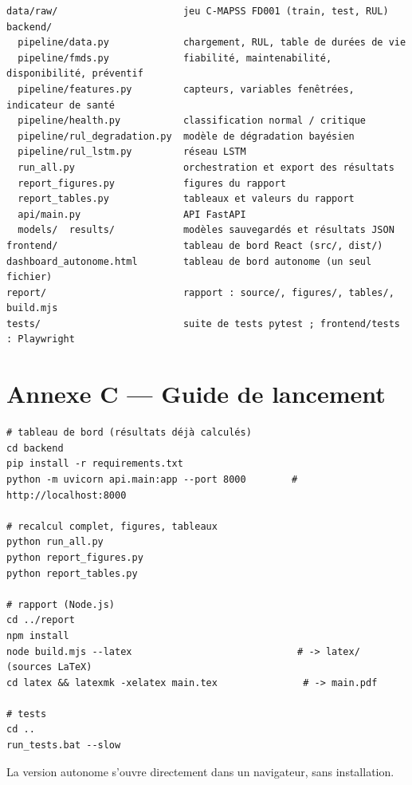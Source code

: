 \begin{verbatim}
data/raw/                      jeu C-MAPSS FD001 (train, test, RUL)
backend/
  pipeline/data.py             chargement, RUL, table de durées de vie
  pipeline/fmds.py             fiabilité, maintenabilité, disponibilité, préventif
  pipeline/features.py         capteurs, variables fenêtrées, indicateur de santé
  pipeline/health.py           classification normal / critique
  pipeline/rul_degradation.py  modèle de dégradation bayésien
  pipeline/rul_lstm.py         réseau LSTM
  run_all.py                   orchestration et export des résultats
  report_figures.py            figures du rapport
  report_tables.py             tableaux et valeurs du rapport
  api/main.py                  API FastAPI
  models/  results/            modèles sauvegardés et résultats JSON
frontend/                      tableau de bord React (src/, dist/)
dashboard_autonome.html        tableau de bord autonome (un seul fichier)
report/                        rapport : source/, figures/, tables/, build.mjs
tests/                         suite de tests pytest ; frontend/tests : Playwright
\end{verbatim}

\section*{Annexe C — Guide de lancement}

\begin{verbatim}
# tableau de bord (résultats déjà calculés)
cd backend
pip install -r requirements.txt
python -m uvicorn api.main:app --port 8000        # http://localhost:8000

# recalcul complet, figures, tableaux
python run_all.py
python report_figures.py
python report_tables.py

# rapport (Node.js)
cd ../report
npm install
node build.mjs --latex                             # -> latex/ (sources LaTeX)
cd latex && latexmk -xelatex main.tex               # -> main.pdf

# tests
cd ..
run_tests.bat --slow
\end{verbatim}

La version autonome  s'ouvre directement dans un navigateur, sans installation.
